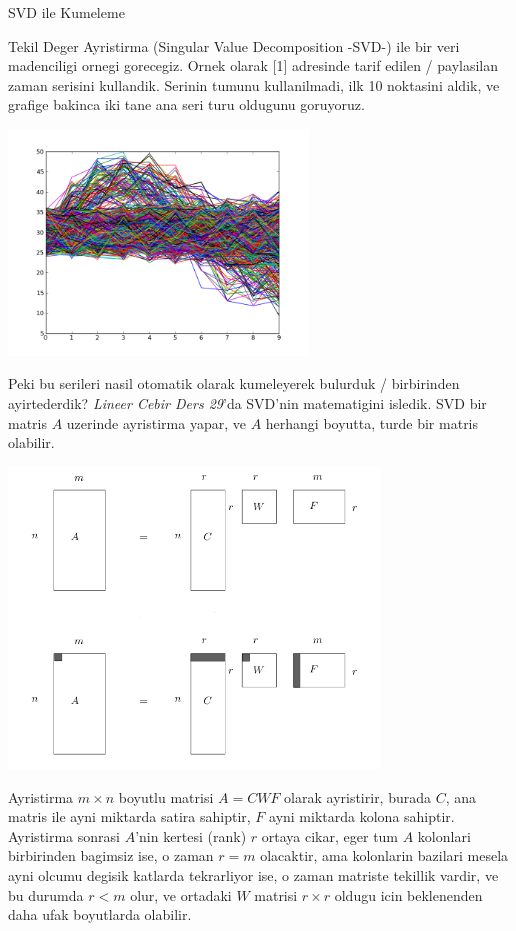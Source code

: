 \documentclass[12pt,fleqn]{article}\usepackage{../common}
\begin{document}
SVD ile Kumeleme

Tekil Deger Ayristirma (Singular Value Decomposition -SVD-) ile bir veri
madenciligi ornegi gorecegiz. Ornek olarak [1] adresinde tarif edilen /
paylasilan zaman serisini kullandik. Serinin tumunu kullanilmadi, ilk 10
noktasini aldik, ve grafige bakinca iki tane ana seri turu oldugunu
goruyoruz.



\includegraphics[height=6cm]{data.png}

Peki bu serileri nasil otomatik olarak kumeleyerek bulurduk / birbirinden
ayirtederdik?  {\em Lineer Cebir Ders 29}'da SVD'nin matematigini
isledik. SVD bir matris $A$ uzerinde ayristirma yapar, ve $A$ herhangi
boyutta, turde bir matris olabilir.

\includegraphics[height=8cm]{svd1.png}

Ayristirma $m \times n$ boyutlu matrisi $A=CWF$ olarak ayristirir, burada
$C$, ana matris ile ayni miktarda satira sahiptir, $F$ ayni miktarda kolona
sahiptir. Ayristirma sonrasi $A$'nin kertesi (rank) $r$ ortaya cikar, eger
tum $A$ kolonlari birbirinden bagimsiz ise, o zaman $r=m$ olacaktir, ama
kolonlarin bazilari mesela ayni olcumu degisik katlarda tekrarliyor ise, o
zaman matriste tekillik vardir, ve bu durumda $r < m$ olur, ve ortadaki $W$
matrisi $r \times r$ oldugu icin beklenenden daha ufak boyutlarda
olabilir. 
\end{document}
